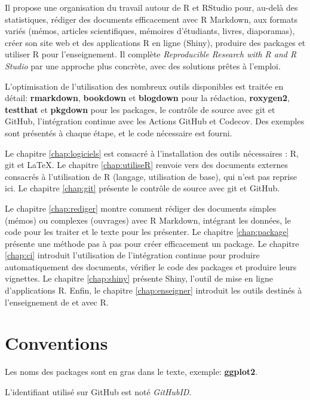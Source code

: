 \documentclass[
  11pt,
  french,
  a4paper,
  extrafontsizes,onecolumn,openright
  ]{memoir}
\begin{document}
Il propose une organisation du travail autour de R et RStudio pour, au-delà des statistiques, rédiger des documents efficacement avec R Markdown, aux formats variés (mémos, articles scientifiques, mémoires d'étudiants, livres, diaporamas), créer son site web et des applications R en ligne (Shiny), produire des packages et utiliser R pour l'enseignement.
Il complète \emph{Reproducible Research with R and R Studio} \autocite{Gandrud2013} par une approche plus concrète, avec des solutions prêtes à l'emploi.

L'optimisation de l'utilisation des nombreux outils disponibles est traitée en détail: \textbf{rmarkdown}, \textbf{bookdown} et \textbf{blogdown} pour la rédaction, \textbf{roxygen2}, \textbf{testthat} et \textbf{pkgdown} pour les packages, le contrôle de source avec git et GitHub, l'intégration continue avec les Actions GitHub et Codecov.
Des exemples sont présentés à chaque étape, et le code nécessaire est fourni.

Le chapitre \ref{chap:logiciels} est consacré à l'installation des outils nécessaires : R, git et LaTeX. Le chapitre \ref{chap:utiliseR} renvoie vers des documents externes consacrés à l'utilisation de R (langage, utilisation de base), qui n'est pas reprise ici.
Le chapitre \ref{chap:git} présente le contrôle de source avec git et GitHub.

Le chapitre \ref{chap:rediger} montre comment rédiger des documents simples (mémos) ou complexes (ouvrages) avec R Markdown, intégrant les données, le code pour les traiter et le texte pour les présenter.
Le chapitre \ref{chap:package} présente une méthode pas à pas pour créer efficacement un package.
Le chapitre \ref{chap:ci} introduit l'utilisation de l'intégration continue pour produire automatiquement des documents, vérifier le code des packages et produire leurs vignettes.
Le chapitre \ref{chap:shiny} présente Shiny, l'outil de mise en ligne d'applications R.
Enfin, le chapitre \ref{chap:enseigner} introduit les outils destinés à l'enseignement de et avec R.

\hypertarget{conventions}{%
\section*{Conventions}\label{conventions}}

Les noms des packages sont en gras dans le texte, exemple: \textbf{ggplot2}.

L'identifiant utilisé sur GitHub est noté \emph{GitHubID}.
\end{document}
